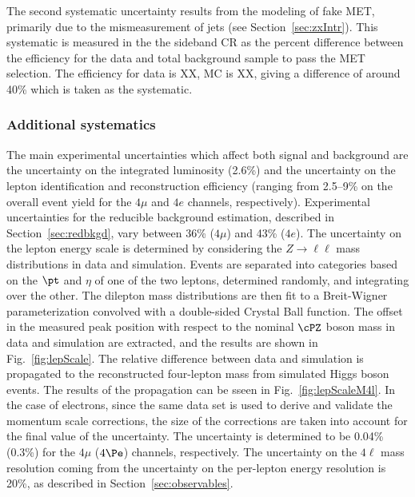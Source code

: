 The second systematic uncertainty results from the modeling of fake MET, primarily due to the mismeasurement of jets (see Section~\ref{sec:zxIntr}). This systematic is measured in the the sideband CR as the percent difference between the efficiency for the data and total background sample to pass the MET selection. The efficiency for data is XX, MC is XX, giving a difference of around 40\% which is taken as the systematic.

\subsubsection{Additional systematics}

The main experimental uncertainties which affect both signal and background are the uncertainty on the integrated luminosity
(2.6\%) and the uncertainty on the lepton identification and reconstruction efficiency (ranging from 2.5--9\% on the 
overall event yield for the $4\mu$ 
and $4e$ channels, respectively). Experimental uncertainties for the reducible background estimation, 
described in Section~\ref{sec:redbkgd},
vary between 36\% ($4\mu$)  and 43\% ($4e$).  The uncertainty on the lepton energy scale is determined by considering the 
$Z\rightarrow\ell\ell$ mass distributions in data and simulation. Events are separated into categories based on the 
$\pt$ and $\eta$ of one of the two leptons, determined randomly, and integrating over the other. The dilepton mass 
distributions are then fit to a Breit-Wigner 
parameterization convolved with a double-sided Crystal Ball function. The offset in the measured peak position with 
respect to the nominal $\cPZ$ boson 
mass in data and simulation are extracted, and the results are shown in Fig.~\ref{fig:lepScale}. The relative difference 
between data and simulation is propagated to the reconstructed four-lepton mass 
from simulated Higgs boson events. The results of the propagation can be sseen in Fig.~\ref{fig:lepScaleM4l}.
In the case of electrons, since the same data set is used to derive and validate the 
momentum scale corrections, the size 
of the corrections are taken into account for the final value of the uncertainty.
The uncertainty is determined to be 0.04\% (0.3\%) for the  $4\mu$ ($4\Pe$) channels, respectively. The uncertainty 
on the $4\ell$ mass resolution coming from the uncertainty on the per-lepton energy resolution is 20\%, 
as described in Section~\ref{sec:observables}.


